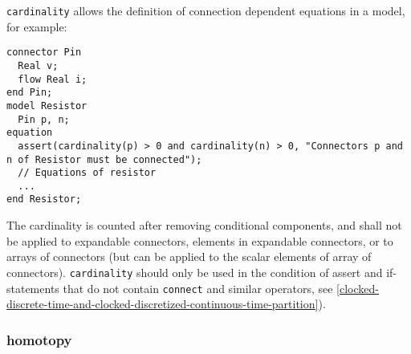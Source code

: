 \begin{nonnormative}
\lstinline!cardinality! allows the definition of connection dependent equations in a model, for example:
\begin{lstlisting}[language=modelica]
connector Pin
  Real v;
  flow Real i;
end Pin;
model Resistor
  Pin p, n;
equation
  assert(cardinality(p) > 0 and cardinality(n) > 0, "Connectors p and n of Resistor must be connected");
  // Equations of resistor
  ...
end Resistor;
\end{lstlisting}
\end{nonnormative}

The cardinality is counted after removing conditional components, and shall not be applied to expandable connectors, elements in expandable connectors, or to arrays of connectors (but can be applied to
the scalar elements of array of connectors).  \lstinline!cardinality! should only be used in the condition of assert and if-statements that do not contain \lstinline!connect! and similar operators,
see \cref{clocked-discrete-time-and-clocked-discretized-continuous-time-partition}).

\subsubsection{homotopy}\label{homotopy}

